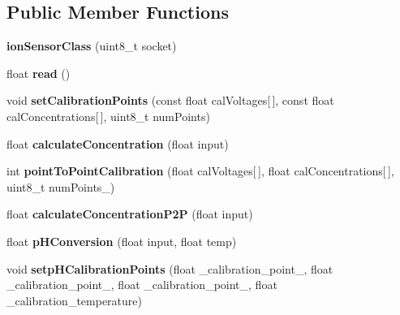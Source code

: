 \subsection*{Public Member Functions}
\begin{DoxyCompactItemize}
\item 
{\bfseries ion\+Sensor\+Class} (uint8\+\_\+t socket)\hypertarget{classion_sensor_class_ac8cfbb4c9f170be2e5c6909e34c21c78}{}\label{classion_sensor_class_ac8cfbb4c9f170be2e5c6909e34c21c78}

\item 
float {\bfseries read} ()\hypertarget{classion_sensor_class_ae85c547f0eb3a9e1768120fc042eab55}{}\label{classion_sensor_class_ae85c547f0eb3a9e1768120fc042eab55}

\item 
void {\bfseries set\+Calibration\+Points} (const float cal\+Voltages\mbox{[}$\,$\mbox{]}, const float cal\+Concentrations\mbox{[}$\,$\mbox{]}, uint8\+\_\+t num\+Points)\hypertarget{classion_sensor_class_a250d1c72eeed1953f8fdd73efe18a416}{}\label{classion_sensor_class_a250d1c72eeed1953f8fdd73efe18a416}

\item 
float {\bfseries calculate\+Concentration} (float input)\hypertarget{classion_sensor_class_aa20350362505478203bb70acb67eddb3}{}\label{classion_sensor_class_aa20350362505478203bb70acb67eddb3}

\item 
int {\bfseries point\+To\+Point\+Calibration} (float cal\+Voltages\mbox{[}$\,$\mbox{]}, float cal\+Concentrations\mbox{[}$\,$\mbox{]}, uint8\+\_\+t num\+Points\+\_\+)\hypertarget{classion_sensor_class_a8906a5394729b5c9782afc88c1a49ba1}{}\label{classion_sensor_class_a8906a5394729b5c9782afc88c1a49ba1}

\item 
float {\bfseries calculate\+Concentration\+P2P} (float input)\hypertarget{classion_sensor_class_a7ef37823b9b04093b577891ee5514011}{}\label{classion_sensor_class_a7ef37823b9b04093b577891ee5514011}

\item 
float {\bfseries p\+H\+Conversion} (float input, float temp)\hypertarget{classion_sensor_class_a3a637639f3237c74b964049f3e38e1a2}{}\label{classion_sensor_class_a3a637639f3237c74b964049f3e38e1a2}

\item 
void {\bfseries setp\+H\+Calibration\+Points} (float \+\_\+calibration\+\_\+point\+\_, float \+\_\+calibration\+\_\+point\+\_, float \+\_\+calibration\+\_\+point\+\_, float \+\_\+calibration\+\_\+temperature)\hypertarget{classion_sensor_class_ab4270d7c617c965131035efa95079a8a}{}\label{classion_sensor_class_ab4270d7c617c965131035efa95079a8a}

\end{DoxyCompactItemize}



